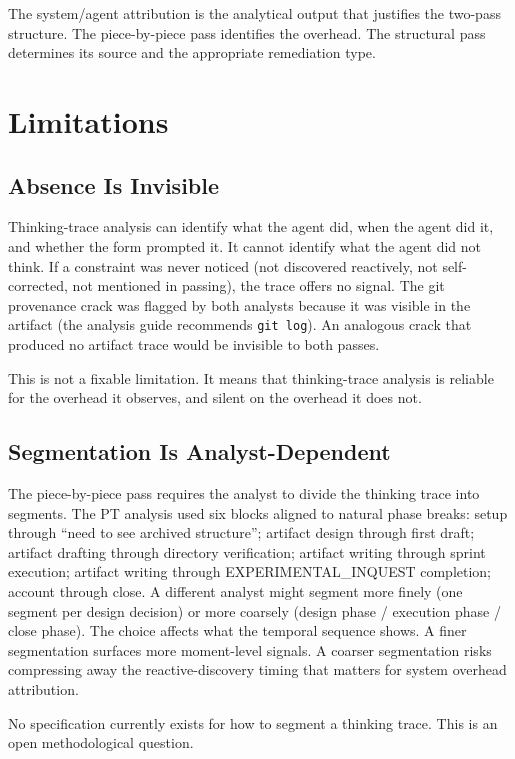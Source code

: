 \documentclass[11pt,a4paper]{article}
\begin{document}
The system/agent attribution is the analytical output that justifies the
two-pass structure. The piece-by-piece pass identifies the overhead. The
structural pass determines its source and the appropriate remediation type.

\section{Limitations}

\subsection{Absence Is Invisible}

Thinking-trace analysis can identify what the agent did, when the agent did it,
and whether the form prompted it. It cannot identify what the agent did not
think. If a constraint was never noticed (not discovered reactively, not
self-corrected, not mentioned in passing), the trace offers no signal. The git
provenance crack was flagged by both analysts because it was visible in the
artifact (the analysis guide recommends \texttt{git log}). An analogous crack
that produced no artifact trace would be invisible to both passes.

This is not a fixable limitation. It means that thinking-trace analysis is
reliable for the overhead it observes, and silent on the overhead it does not.

\subsection{Segmentation Is Analyst-Dependent}

The piece-by-piece pass requires the analyst to divide the thinking trace into
segments. The PT analysis used six blocks aligned to natural phase breaks:
setup through ``need to see archived structure''; artifact design through first
draft; artifact drafting through directory verification; artifact writing
through sprint execution; artifact writing through EXPERIMENTAL\_INQUEST
completion; account through close. A different analyst might segment more
finely (one segment per design decision) or more coarsely (design phase /
execution phase / close phase). The choice affects what the temporal sequence
shows. A finer segmentation surfaces more moment-level signals. A coarser
segmentation risks compressing away the reactive-discovery timing that matters
for system overhead attribution.

No specification currently exists for how to segment a thinking trace. This is
an open methodological question.
\end{document}
